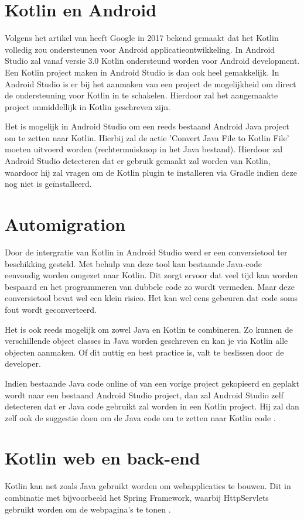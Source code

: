 \section{Kotlin en Android}
\label{sec:kotlinandroid}
Volgens het artikel van \textcite{GoogleSupportKotlin} heeft Google in 2017 bekend gemaakt dat het Kotlin volledig zou ondersteunen voor Android applicatieontwikkeling. In Android Studio zal vanaf versie 3.0 Kotlin ondersteund worden voor Android development. Een Kotlin project maken in Android Studio is dan ook heel gemakkelijk. In Android Studio is er bij het aanmaken van een project de mogelijkheid om direct de ondersteuning voor Kotlin in te schakelen. Hierdoor zal het aangemaakte project onmiddellijk in Kotlin geschreven zijn.

Het is mogelijk in Android Studio om een reeds bestaand Android Java project om te zetten naar Kotlin. Hierbij zal de actie 'Convert Java File to Kotlin File' moeten uitvoerd worden (rechtermuisknop in het Java bestand). Hierdoor zal Android Studio detecteren dat er gebruik gemaakt zal worden van Kotlin, waardoor hij zal vragen om de Kotlin plugin te installeren via Gradle indien deze nog niet is geïnstalleerd.


\section{Automigration}
\label{sec:Automigration}
Door de intergratie van Kotlin in Android Studio werd er een conversietool ter beschikking gesteld. Met behulp van deze tool kan bestaande Java-code eenvoudig worden omgezet naar Kotlin. Dit zorgt ervoor dat veel tijd kan worden bespaard en het programmeren van dubbele code zo wordt vermeden. Maar deze conversietool bevat wel een klein risico. Het kan wel eens gebeuren dat code soms fout wordt geconverteerd. 

Het is ook reeds mogelijk om zowel Java en Kotlin te combineren. Zo kunnen de verschillende object classes in Java worden geschreven en kan je via Kotlin alle objecten aanmaken. Of dit nuttig en best practice is, valt te beslissen door de developer.

Indien bestaande Java code online of van een vorige project gekopieerd en geplakt wordt naar een bestaand Android Studio project, dan zal Android Studio zelf detecteren dat er Java code gebruikt zal worden in een Kotlin project. Hij zal dan zelf ook de suggestie doen om de Java code om te zetten naar Kotlin code \autocite{Avantica2017}.


\section{Kotlin web en back-end}
\label{sec:kotlincrossplatform}
Kotlin kan net zoals Java gebruikt worden om webapplicaties te bouwen. Dit in combinatie met bijvoorbeeld het Spring Framework, waarbij HttpServlets gebruikt worden om de webpagina's te tonen \autocite{JetBrainsWeb}.

